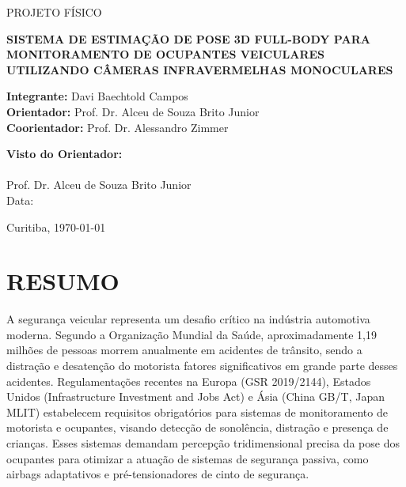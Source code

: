 \documentclass[12pt, a4paper]{article}
\begin{document}
\begin{titlepage}
    \centering
    {\large PROJETO FÍSICO \par}
    \vspace{1.5cm}
    {\bfseries\Large SISTEMA DE ESTIMAÇÃO DE POSE 3D FULL-BODY PARA MONITORAMENTO DE OCUPANTES VEICULARES UTILIZANDO CÂMERAS INFRAVERMELHAS MONOCULARES \par}
    \vspace{2.5cm}

    \begin{flushleft}
        \textbf{Integrante:} Davi Baechtold Campos \\[0.3cm]
        \textbf{Orientador:} Prof. Dr. Alceu de Souza Brito Junior \\
        \textbf{Coorientador:} Prof. Dr. Alessandro Zimmer
    \end{flushleft}

    \vfill
    \begin{flushleft}
        \textbf{Visto do Orientador:}\\[1.4cm]
        \makebox[9cm]{\hrulefill}\\
        \small Prof. Dr. Alceu de Souza Brito Junior \\[0.5cm]
        Data: \underline{\hspace{3cm}}
    \end{flushleft}

    \vfill
    {\large Curitiba, \today \par}
\end{titlepage}

\tableofcontents
\newpage
\setcounter{page}{1}

\section{RESUMO}

A segurança veicular representa um desafio crítico na indústria automotiva moderna. Segundo a Organização Mundial da Saúde, aproximadamente 1,19 milhões de pessoas morrem anualmente em acidentes de trânsito, sendo a distração e desatenção do motorista fatores significativos em grande parte desses acidentes. Regulamentações recentes na Europa (GSR 2019/2144), Estados Unidos (Infrastructure Investment and Jobs Act) e Ásia (China GB/T, Japan MLIT) estabelecem requisitos obrigatórios para sistemas de monitoramento de motorista e ocupantes, visando detecção de sonolência, distração e presença de crianças. Esses sistemas demandam percepção tridimensional precisa da pose dos ocupantes para otimizar a atuação de sistemas de segurança passiva, como airbags adaptativos e pré-tensionadores de cinto de segurança.
\end{document}
